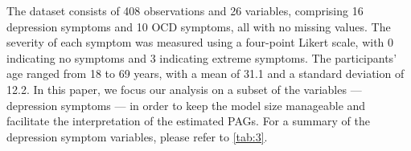 \documentclass[twoside, 11pt]{article}
\begin{document}
The dataset consists of 408 observations and 26 variables, comprising 16 depression symptoms and 10 OCD symptoms, all with no missing values. The severity of each symptom was measured using a four-point Likert scale, with 0 indicating no symptoms and 3 indicating extreme symptoms. The participants' age ranged from 18 to 69 years, with a mean of 31.1 and a standard deviation of 12.2. In this paper, we focus our analysis on a subset of the variables --- depression symptoms --- in order to keep the model size manageable and facilitate the interpretation of the estimated PAGs.
For a summary of the depression symptom variables, please refer to \autoref{tab:3}.

 
\end{document}
